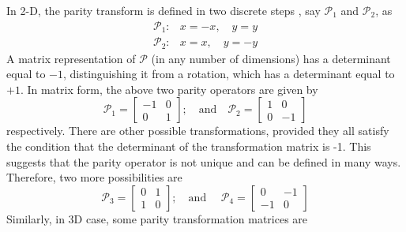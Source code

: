 \documentclass[a4paper, 12pt]{article}
\begin{document}
In 2-D, the parity transform is defined in two discrete steps \cite{mandal2013pt}, say \( \mathcal{P}_1 \) and \( \mathcal{P}_2 \), as  
\begin{align*}
\mathcal{P}_1:&x=-x,\quad y=y\\
\mathcal{P}_2:&x=x,\quad y=-y
\end{align*}
A matrix representation of \( \mathcal{P} \) (in any number of dimensions) has a determinant equal to \(-1\), distinguishing it from a rotation, which has a determinant equal to \(+1\). In matrix form, the above two parity operators are given by
\begin{equation}\label{2D-P}
\mathcal{P}_1=\begin{bmatrix}
-1&0\\
0&1
\end{bmatrix};\quad\mbox{and}\quad
\mathcal{P}_2=\begin{bmatrix}
1&0\\
0&-1
\end{bmatrix}
\end{equation}
respectively. There are other possible transformations, provided they all satisfy the condition that the determinant of the transformation matrix is -1. This suggests that the parity operator is not unique and can be defined in many ways. Therefore, two more possibilities are
\begin{equation}
\mathcal{P}_3=\begin{bmatrix}
0&1\\
1&0
\end{bmatrix};\quad \text{and }\quad
\mathcal{P}_4=\begin{bmatrix}
0&-1\\
-1&0
\end{bmatrix}
\end{equation}
Similarly, in 3D case, some parity transformation matrices are 
\end{document}
